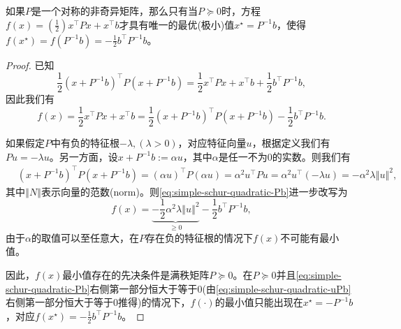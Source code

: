 \begin{subappendices}
\begin{proposition}
  \label{prop:simple-schur-quadratic-optim}
如果$P$是一个对称的非奇异矩阵，那么只有当$P \succeq 0$时，方程$f(x) = \left(\frac{1}{2}\right) x^{\top} P x + x^{\top} b$才具有唯一的最优(极小)值$x^{\star}=P^{-1} b$，使得$f(x^{\star}) = f(P^{-1} b) = -\frac{1}{2} b^{\top} P^{-1} b$。
\end{proposition}
\begin{proof}
  已知
  \begin{equation*}
    \frac{1}{2}\left( x + P^{-1} b \right)^{\top} P \left( x + P^{-1} b \right) = \frac{1}{2} x^{\top} P x + x ^{\top} b + \frac{1}{2} b^{\top} P^{-1} b,
  \end{equation*}
  因此我们有
  \begin{equation}
    \label{eq:simple-schur-quadratic-Pb}
    f(x) = \frac{1}{2} x^{\top} P x + x^{\top} b = \frac{1}{2}\left( x + P^{-1} b \right)^{\top} P \left( x + P^{-1} b \right) - \frac{1}{2} b^{\top} P^{-1} b.
  \end{equation}

  如果假定$P$中有负的特征根$-\lambda, (\lambda > 0)$，对应特征向量$u$，根据定义我们有$P u = - \lambda u$。另一方面，设$x + P^{-1} b := \alpha u$，其中$\alpha$是任一不为$0$的实数。则我们有
  \begin{equation*}
\begin{split}
&      \left( x + P^{-1} b \right)^{\top} P \left( x + P^{-1} b \right) =\left( \alpha u \right)^{\top} P \left( \alpha u \right) = \alpha^2 u^{\top} P u = \alpha^2 u^{\top} (-\lambda u) = - \alpha^2 \lambda \left\Vert u \right\Vert^{2},
\end{split}
  \end{equation*}
其中$\left\Vert N \right\Vert$表示向量的范数(norm)。则\eqref{eq:simple-schur-quadratic-Pb}进一步改写为
\begin{equation}
  \label{eq:simple-schur-quadratic-uPb}
  f(x) = \underbrace{- \frac{1}{2} \alpha^2 \lambda \left\Vert u \right\Vert^{2}}_{\ge 0} - \frac{1}{2}b^{\top} P^{-1} b,
\end{equation}
由于$\alpha$的取值可以至任意大，在$P$存在负的特征根的情况下$f(x)$不可能有最小值。

因此，$f(x)$最小值存在的先决条件是满秩矩阵$P \succeq 0$。在$P \succeq 0$并且\eqref{eq:simple-schur-quadratic-Pb}右侧第一部分恒大于等于$0$(由\eqref{eq:simple-schur-quadratic-uPb}右侧第一部分恒大于等于$0$推得)的情况下，$f(\cdot)$的最小值只能出现在$x^{\star} = - P^{-1} b$，对应$f(x^{\star}) = - \frac{1}{2} b^{\top} P^{-1} b$。
\end{proof}


\end{subappendices}
